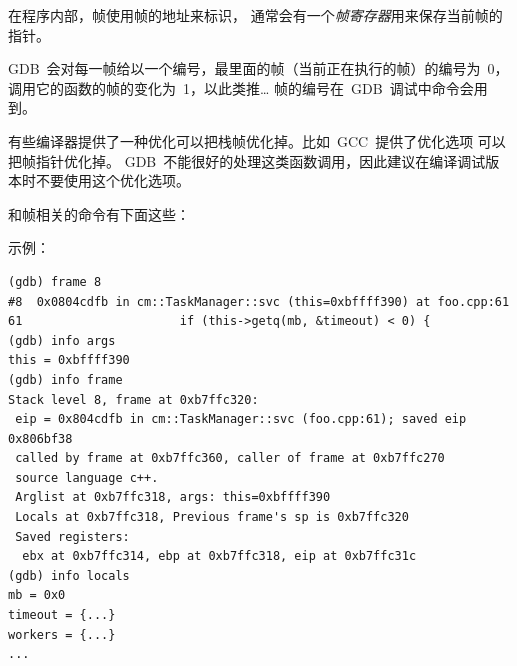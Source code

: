 在程序内部，帧使用帧的地址来标识，
通常会有一个\emph{帧寄存器}用来保存当前帧的指针。

GDB~会对每一帧给以一个编号，最里面的帧（当前正在执行的帧）的编号为~0，
调用它的函数的帧的变化为~1，以此类推\ldots
帧的编号在~GDB~调试中命令会用到。

有些编译器提供了一种优化可以把栈帧优化掉。比如~GCC~提供了优化选项
可以把帧指针优化掉。
GDB~不能很好的处理这类函数调用，因此建议在编译调试版本时不要使用这个优化选项。

和帧相关的命令有下面这些：

\noindent
{}



\noindent
{}


\noindent
{}


\noindent
{}


\noindent
{}


\noindent
{}


\noindent
{}



示例：
\begin{lstlisting}
(gdb) frame 8
#8  0x0804cdfb in cm::TaskManager::svc (this=0xbffff390) at foo.cpp:61
61	                    if (this->getq(mb, &timeout) < 0) {
(gdb) info args
this = 0xbffff390
(gdb) info frame
Stack level 8, frame at 0xb7ffc320:
 eip = 0x804cdfb in cm::TaskManager::svc (foo.cpp:61); saved eip 0x806bf38
 called by frame at 0xb7ffc360, caller of frame at 0xb7ffc270
 source language c++.
 Arglist at 0xb7ffc318, args: this=0xbffff390
 Locals at 0xb7ffc318, Previous frame's sp is 0xb7ffc320
 Saved registers:
  ebx at 0xb7ffc314, ebp at 0xb7ffc318, eip at 0xb7ffc31c
(gdb) info locals
mb = 0x0
timeout = {...}
workers = {...}
...
\end{lstlisting}


